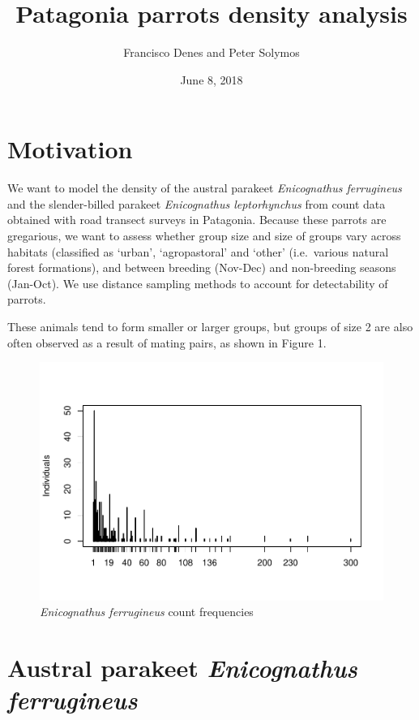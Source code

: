 \documentclass[]{article}
\title{Patagonia parrots density analysis}
\author{Francisco Denes and Peter Solymos}
\date{June 8, 2018}
\begin{document}
\maketitle

\section{Motivation}\label{motivation}

We want to model the density of the austral parakeet \emph{Enicognathus
ferrugineus} and the slender-billed parakeet \emph{Enicognathus
leptorhynchus} from count data obtained with road transect surveys in
Patagonia. Because these parrots are gregarious, we want to assess
whether group size and size of groups vary across habitats (classified
as `urban', `agropastoral' and `other' (i.e.~various natural forest
formations), and between breeding (Nov-Dec) and non-breeding seasons
(Jan-Oct). We use distance sampling methods to account for detectability
of parrots.

These animals tend to form smaller or larger groups, but groups of size
2 are also often observed as a result of mating pairs, as shown in
Figure 1.

\begin{figure}[H]
\includegraphics{Patagonia_parrots_density_analysis_files/figure-latex/unnamed-chunk-1-1} \caption{\textit{Enicognathus ferrugineus} count frequencies}\label{fig:unnamed-chunk-1}
\end{figure}

\section{\texorpdfstring{Austral parakeet \emph{Enicognathus
ferrugineus}}{Austral parakeet Enicognathus ferrugineus}}\label{austral-parakeet-enicognathus-ferrugineus}
\end{document}
